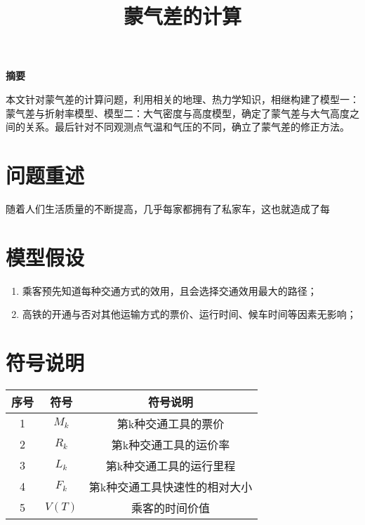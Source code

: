 \documentclass[12pt]{article}
\begin{document}
\title{\centering\textbf{蒙气差的计算}}
\date{}
\maketitle{}

\begin{center}
  \textbf{摘要}
\end{center}

本文针对蒙气差的计算问题，利用相关的地理、热力学知识，相继构建了模型一：蒙气差与折射率模型、模型二：大气密度与高度模型，确定了蒙气差与大气高度之间的关系。最后针对不同观测点气温和气压的不同，确立了蒙气差的修正方法。

\newpage

\section{问题重述}
随着人们生活质量的不断提高，几乎每家都拥有了私家车，这也就造成了每

\section{模型假设}

\begin{enumerate}
  \item 乘客预先知道每种交通方式的效用，且会选择交通效用最大的路径；
  \item 高铁的开通与否对其他运输方式的票价、运行时间、候车时间等因素无影响；
\end{enumerate}

\newpage

\section{符号说明}

\begin{table}[!h]
\center
\setlength{\tabcolsep}{8mm}{}
\renewcommand\arraystretch{2.3}
\begin{tabular}{|c|cc|}
\hline
序号&符号&符号说明\\
\hline
1&$M_{k}$&第k种交通工具的票价\\
2&$R_{k}$&第k种交通工具的运价率\\
3&$L_{k}$&第k种交通工具的运行里程\\
4&$F_{k}$&第k种交通工具快速性的相对大小\\
5&$V(T)$&乘客的时间价值\\
\hline
\end{tabular}
\end{table}
\end{document}
